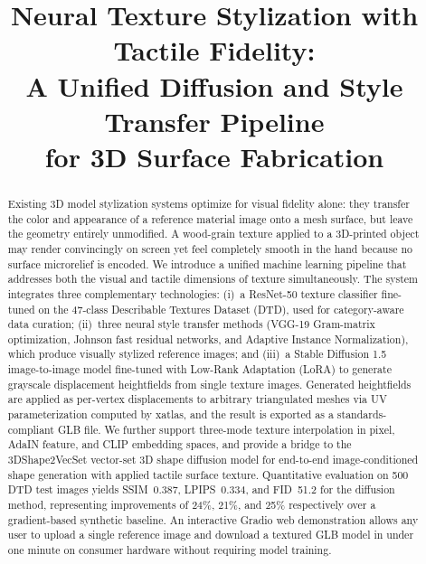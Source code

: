 \documentclass[conference]{IEEEtran}
\begin{document}
\title{Neural Texture Stylization with Tactile Fidelity:\\
A Unified Diffusion and Style Transfer Pipeline\\
for 3D Surface Fabrication}

\author{
}

\maketitle

\begin{abstract}
Existing 3D model stylization systems optimize for visual fidelity alone: they
transfer the color and appearance of a reference material image onto a mesh
surface, but leave the geometry entirely unmodified. A wood-grain texture
applied to a 3D-printed object may render convincingly on screen yet feel
completely smooth in the hand because no surface microrelief is encoded.
We introduce a unified machine learning pipeline that addresses both the visual
and tactile dimensions of texture simultaneously. The system integrates three
complementary technologies: (i)~a ResNet-50 texture classifier fine-tuned on
the 47-class Describable Textures Dataset (DTD), used for category-aware
data curation; (ii)~three neural style transfer methods (VGG-19 Gram-matrix
optimization, Johnson fast residual networks, and Adaptive Instance
Normalization), which produce visually stylized reference images; and
(iii)~a Stable Diffusion 1.5 image-to-image model fine-tuned with Low-Rank
Adaptation (LoRA) to generate grayscale displacement heightfields from
single texture images. Generated heightfields are applied as per-vertex
displacements to arbitrary triangulated meshes via UV parameterization
computed by xatlas, and the result is exported as a standards-compliant GLB
file. We further support three-mode texture interpolation in pixel, AdaIN
feature, and CLIP embedding spaces, and provide a bridge to the
3DShape2VecSet vector-set 3D shape diffusion model for end-to-end
image-conditioned shape generation with applied tactile surface texture.
Quantitative evaluation on 500 DTD test images yields SSIM~0.387,
LPIPS~0.334, and FID~51.2 for the diffusion method, representing improvements
of 24\%, 21\%, and 25\% respectively over a gradient-based synthetic baseline.
An interactive Gradio web demonstration allows any user to upload a single
reference image and download a textured GLB model in under one minute on
consumer hardware without requiring model training.
\end{abstract}
\end{document}
